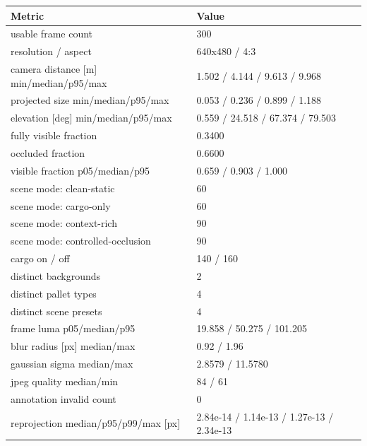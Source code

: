 \begin{tabular}{ll}
\toprule
Metric & Value \\
\midrule
usable frame count & 300 \\
resolution / aspect & 640x480 / 4:3 \\
camera distance [m] min/median/p95/max & 1.502 / 4.144 / 9.613 / 9.968 \\
projected size min/median/p95/max & 0.053 / 0.236 / 0.899 / 1.188 \\
elevation [deg] min/median/p95/max & 0.559 / 24.518 / 67.374 / 79.503 \\
fully visible fraction & 0.3400 \\
occluded fraction & 0.6600 \\
visible fraction p05/median/p95 & 0.659 / 0.903 / 1.000 \\
scene mode: clean-static & 60 \\
scene mode: cargo-only & 60 \\
scene mode: context-rich & 90 \\
scene mode: controlled-occlusion & 90 \\
cargo on / off & 140 / 160 \\
distinct backgrounds & 2 \\
distinct pallet types & 4 \\
distinct scene presets & 4 \\
frame luma p05/median/p95 & 19.858 / 50.275 / 101.205 \\
blur radius [px] median/max & 0.92 / 1.96 \\
gaussian sigma median/max & 2.8579 / 11.5780 \\
jpeg quality median/min & 84 / 61 \\
annotation invalid count & 0 \\
reprojection median/p95/p99/max [px] & 2.84e-14 / 1.14e-13 / 1.27e-13 / 2.34e-13 \\
\bottomrule
\end{tabular}
